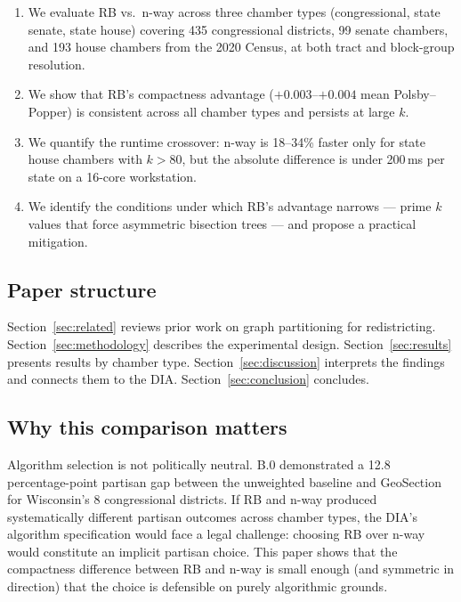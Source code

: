 \begin{enumerate}
  \item We evaluate RB vs.\ n-way across three chamber types
    (congressional, state senate, state house) covering 435 congressional
    districts, 99 senate chambers, and 193 house chambers from the 2020
    Census, at both tract and block-group resolution.
  \item We show that RB's compactness advantage ($+0.003$--$+0.004$ mean
    Polsby--Popper) is consistent across all chamber types and persists at
    large $k$.
  \item We quantify the runtime crossover: n-way is 18--34\% faster only for
    state house chambers with $k > 80$, but the absolute difference is under
    200\,ms per state on a 16-core workstation.
  \item We identify the conditions under which RB's advantage narrows ---
    prime $k$ values that force asymmetric bisection trees --- and propose a
    practical mitigation.
\end{enumerate}

\subsection*{Paper structure}

Section~\ref{sec:related} reviews prior work on graph partitioning for
redistricting.  Section~\ref{sec:methodology} describes the experimental
design.  Section~\ref{sec:results} presents results by chamber type.
Section~\ref{sec:discussion} interprets the findings and connects them to
the DIA.  Section~\ref{sec:conclusion} concludes.

\subsection*{Why this comparison matters}

Algorithm selection is not politically neutral.  B.0 demonstrated a 12.8
percentage-point partisan gap between the unweighted baseline and GeoSection
for Wisconsin's 8 congressional districts.  If RB and n-way produced
systematically different partisan outcomes across chamber types, the DIA's
algorithm specification would face a legal challenge: choosing RB over n-way
would constitute an implicit partisan choice.  This paper shows that the
compactness difference between RB and n-way is small enough (and symmetric
in direction) that the choice is defensible on purely algorithmic grounds.
